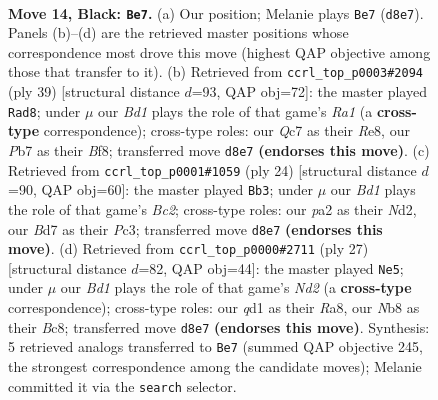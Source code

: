 \documentclass[11pt]{article}
\begin{document}
\clearpage

\begin{figure}[p]\centering
\begin{subfigure}{0.46\textwidth}\centering
\resizebox{\linewidth}{!}{%
\newchessgame
\chessboard[
  setfen={rn1br1k1/ppqb1ppp/4pn2/2Pp4/N2P4/3B1N2/PP1B1PPP/2RQR1K1 b - - 14 14},
  showmover=false,
  pgfstyle=straightmove, color=movearrow, markmove={d8-e7}
]}
\caption{}
\end{subfigure}\hfill
\begin{subfigure}{0.46\textwidth}\centering
\resizebox{\linewidth}{!}{%
\newchessgame
\chessboard[
  setfen={r3rbk1/1bqn1pp1/p2p1n1p/2p5/P3P3/1P1B1N1P/1B1N1PP1/2RQR1K1 b - - 1 20},
  showmover=false,
  pgfstyle=straightmove, color=movearrow, markmove={a8-d8}
]}
\caption{}
\end{subfigure}
\\[4pt]
\begin{subfigure}{0.46\textwidth}\centering
\resizebox{\linewidth}{!}{%
\newchessgame
\chessboard[
  setfen={r1bq1rk1/2p1npbp/p1np2p1/8/1p2P3/2PQBN2/PPBN1PPP/R3R1K1 w - - 0 13},
  showmover=false,
  pgfstyle=straightmove, color=movearrow, markmove={c2-b3}
]}
\caption{}
\end{subfigure}\hfill
\begin{subfigure}{0.46\textwidth}\centering
\resizebox{\linewidth}{!}{%
\newchessgame
\chessboard[
  setfen={r1b1r1k1/ppqn1pbp/2pp1np1/8/P1BBP3/2N2N1P/1PPQ1PP1/R3R1K1 b - - 4 14},
  showmover=false,
  pgfstyle=straightmove, color=movearrow, markmove={d7-e5}
]}
\caption{}
\end{subfigure}
\caption{\textbf{Move 14, Black: \texttt{Be7}.} (a) Our position; Melanie plays \texttt{Be7} (\texttt{d8e7}). Panels (b)--(d) are the retrieved master positions whose correspondence most drove this move (highest QAP objective among those that transfer to it). (b) Retrieved from \texttt{ccrl\_top\_p0003\#2094} (ply 39) [structural distance $d$=93, QAP obj=72]: the master played \texttt{Rad8}; under $\mu$ our \emph{Bd1} plays the role of that game's \emph{Ra1} (a \textbf{cross-type} correspondence); cross-type roles: our \emph{Q}c7 as their \emph{R}e8, our \emph{P}b7 as their \emph{B}f8; transferred move \texttt{d8e7} \textbf{(endorses this move)}. (c) Retrieved from \texttt{ccrl\_top\_p0001\#1059} (ply 24) [structural distance $d$=90, QAP obj=60]: the master played \texttt{Bb3}; under $\mu$ our \emph{Bd1} plays the role of that game's \emph{Bc2}; cross-type roles: our \emph{p}a2 as their \emph{N}d2, our \emph{B}d7 as their \emph{P}c3; transferred move \texttt{d8e7} \textbf{(endorses this move)}. (d) Retrieved from \texttt{ccrl\_top\_p0000\#2711} (ply 27) [structural distance $d$=82, QAP obj=44]: the master played \texttt{Ne5}; under $\mu$ our \emph{Bd1} plays the role of that game's \emph{Nd2} (a \textbf{cross-type} correspondence); cross-type roles: our \emph{q}d1 as their \emph{R}a8, our \emph{N}b8 as their \emph{B}c8; transferred move \texttt{d8e7} \textbf{(endorses this move)}. Synthesis: 5 retrieved analogs transferred to \texttt{Be7} (summed QAP objective 245, the strongest correspondence among the candidate moves); Melanie committed it via the \texttt{search} selector.}
\label{fig:thought-m27}
\end{figure}
\end{document}
